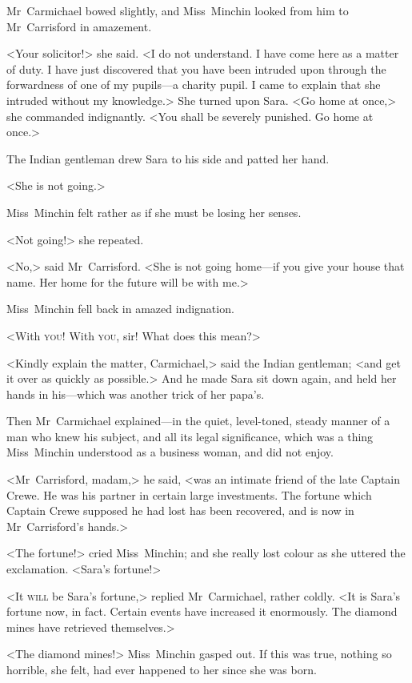 Mr~Carmichael bowed slightly, and Miss~Minchin looked from him to Mr~Carrisford in amazement.

<Your solicitor!> she said. <I do not understand. I have come here as a matter of duty. I have just discovered that you have been intruded upon through the forwardness of one of my pupils—a charity pupil. I came to explain that she intruded without my knowledge.> She turned upon Sara. <Go home at once,> she commanded indignantly. <You shall be severely punished. Go home at once.>

The Indian gentleman drew Sara to his side and patted her hand.

<She is not going.>

Miss~Minchin felt rather as if she must be losing her senses.

<Not going!> she repeated.

<No,> said Mr~Carrisford. <She is not going home—if you give your house that name. Her home for the future will be with me.>

Miss~Minchin fell back in amazed indignation.

<With \textsc{you}! With \textsc{you,} sir! What does this mean?>

<Kindly explain the matter, Carmichael,> said the Indian gentleman; <and get it over as quickly as possible.> And he made Sara sit down again, and held her hands in his—which was another trick of her papa's.

Then Mr~Carmichael explained—in the quiet, level-toned, steady manner of a man who knew his subject, and all its legal significance, which was a thing Miss~Minchin understood as a business woman, and did not enjoy.

<Mr~Carrisford, madam,> he said, <was an intimate friend of the late Captain Crewe. He was his partner in certain large investments. The fortune which Captain Crewe supposed he had lost has been recovered, and is now in Mr~Carrisford's hands.>

<The fortune!> cried Miss~Minchin; and she really lost colour as she uttered the exclamation. <Sara's fortune!>

<It \textsc{will} be Sara's fortune,> replied Mr~Carmichael, rather coldly. <It is Sara's fortune now, in fact. Certain events have increased it enormously. The diamond mines have retrieved themselves.>

<The diamond mines!> Miss~Minchin gasped out. If this was true, nothing so horrible, she felt, had ever happened to her since she was born.


